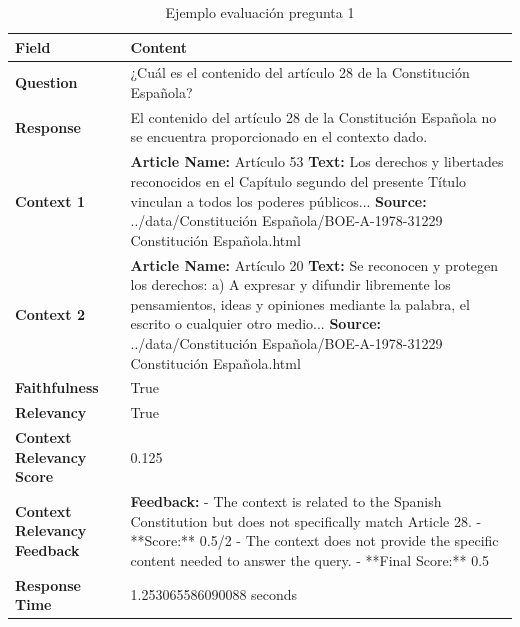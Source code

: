 \begin{table}[h]
\centering
\begin{tabular}{|p{4cm}|p{11cm}|}
\hline
\textbf{Field} & \textbf{Content} \\ \hline
\textbf{Question} & ¿Cuál es el contenido del artículo 28 de la Constitución Española? \\ \hline
\textbf{Response} & El contenido del artículo 28 de la Constitución Española no se encuentra proporcionado en el contexto dado. \\ \hline
\textbf{Context 1} & 
\textbf{Article Name:} Artículo 53 \newline 
\textbf{Text:} Los derechos y libertades reconocidos en el Capítulo segundo del presente Título vinculan a todos los poderes públicos... \newline
\textbf{Source:} ../data/Constitución Española/BOE-A-1978-31229 Constitución Española.html
\\ \hline
\textbf{Context 2} & 
\textbf{Article Name:} Artículo 20 \newline
\textbf{Text:} Se reconocen y protegen los derechos: \newline
a) A expresar y difundir libremente los pensamientos, ideas y opiniones mediante la palabra, el escrito o cualquier otro medio... \newline
\textbf{Source:} ../data/Constitución Española/BOE-A-1978-31229 Constitución Española.html
\\ \hline
\textbf{Faithfulness} & True \\ \hline
\textbf{Relevancy} & True \\ \hline
\textbf{Context Relevancy Score} & 0.125 \\ \hline
\textbf{Context Relevancy Feedback} & 
\textbf{Feedback:} \newline
- The context is related to the Spanish Constitution but does not specifically match Article 28. \newline
- **Score:** 0.5/2 \newline
- The context does not provide the specific content needed to answer the query. \newline
- **Final Score:** 0.5
\\ \hline
\textbf{Response Time} & 1.253065586090088 seconds \\ \hline
\end{tabular}
\caption{Ejemplo evaluación pregunta 1}
\label{tab:evaluation1}
\end{table}

